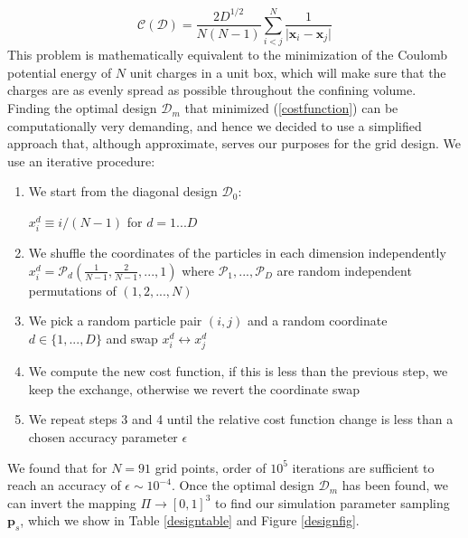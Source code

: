 \documentclass[reprint,aps,prd,superscriptaddress,showkeys,showpacs]{revtex4-1}
\begin{document}
\begin{equation}
\label{costfunction}
\mathcal{C}(\mathcal{D}) = \frac{2D^{1/2}}{N(N-1)}\sum_{i<j}^N\frac{1}{\vert\mathbf{x}_i-\mathbf{x}_j\vert}
\end{equation} 
%
This problem is mathematically equivalent to the minimization of the Coulomb potential energy of $N$ unit charges in a unit box, which will make sure that the charges are as evenly spread as possible throughout the confining volume. Finding the optimal design $\mathcal{D}_m$ that minimized (\ref{costfunction}) can be computationally very demanding, and hence we decided to use a simplified approach that, although approximate, serves our purposes for the grid design. We use an iterative procedure:
\begin{enumerate}
\item We start from the diagonal design $\mathcal{D}_0$: 

$x_i^d\equiv i/(N-1)$ for $d=1...D$
\item We shuffle the coordinates of the particles in each dimension independently $x_i^d = \mathcal{P}_d\left(\frac{1}{N-1},\frac{2}{N-1},...,1\right)$ where $\mathcal{P}_1,...,\mathcal{P}_D$ are random independent permutations of $(1,2,...,N)$
\item We pick a random particle pair $(i,j)$ and a random coordinate $d\in\{1,...,D\}$ and swap $x_i^d\leftrightarrow x_j^d$
\item We compute the new cost function, if this is less than the previous step, we keep the exchange, otherwise we revert the coordinate swap
\item We repeat steps 3 and 4 until the relative cost function change is less than a chosen accuracy parameter $\epsilon$ 
\end{enumerate}
%
We found that for $N=91$ grid points, order of $10^5$ iterations are sufficient to reach an accuracy of $\epsilon\sim10^{-4}$. Once the optimal design $\mathcal{D}_m$ has been found, we can invert the mapping $\Pi\rightarrow[0,1]^3$ to find our simulation parameter sampling $\mathbf{p}_s$, which we show in Table \ref{designtable} and Figure \ref{designfig}.
%
\end{document}

